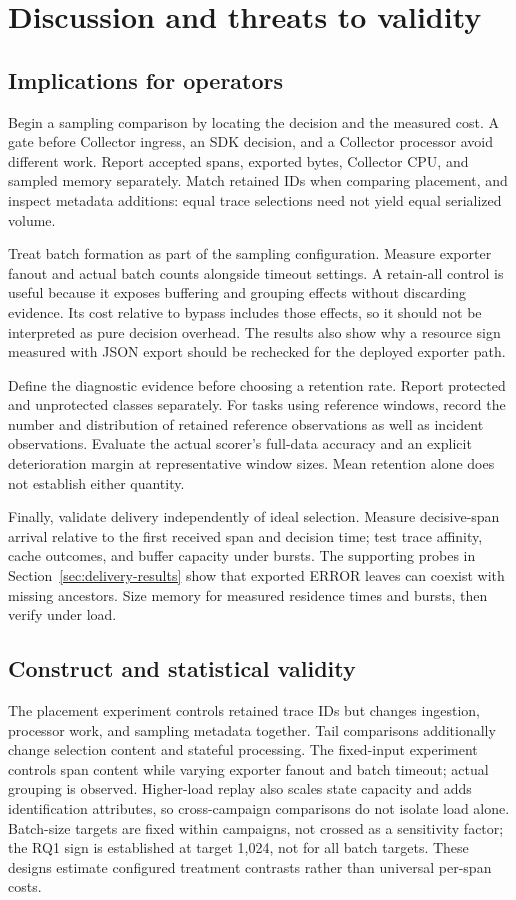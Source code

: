 \section{Discussion and threats to validity}\label{sec:discussion}
\subsection{Implications for operators}
Begin a sampling comparison by locating the decision and the measured cost. A gate before Collector ingress, an SDK decision, and a Collector processor avoid different work. Report accepted spans, exported bytes, Collector CPU, and sampled memory separately. Match retained IDs when comparing placement, and inspect metadata additions: equal trace selections need not yield equal serialized volume.

Treat batch formation as part of the sampling configuration. Measure exporter fanout and actual batch counts alongside timeout settings. A retain-all control is useful because it exposes buffering and grouping effects without discarding evidence. Its cost relative to bypass includes those effects, so it should not be interpreted as pure decision overhead. The results also show why a resource sign measured with JSON export should be rechecked for the deployed exporter path.

Define the diagnostic evidence before choosing a retention rate. Report protected and unprotected classes separately. For tasks using reference windows, record the number and distribution of retained reference observations as well as incident observations. Evaluate the actual scorer's full-data accuracy and an explicit deterioration margin at representative window sizes. Mean retention alone does not establish either quantity.

Finally, validate delivery independently of ideal selection. Measure decisive-span arrival relative to the first received span and decision time; test trace affinity, cache outcomes, and buffer capacity under bursts. The supporting probes in Section~\ref{sec:delivery-results} show that exported ERROR leaves can coexist with missing ancestors. Size memory for measured residence times and bursts, then verify under load.

\subsection{Construct and statistical validity}
The placement experiment controls retained trace IDs but changes ingestion, processor work, and sampling metadata together. Tail comparisons additionally change selection content and stateful processing. The fixed-input experiment controls span content while varying exporter fanout and batch timeout; actual grouping is observed. Higher-load replay also scales state capacity and adds identification attributes, so cross-campaign comparisons do not isolate load alone. Batch-size targets are fixed within campaigns, not crossed as a sensitivity factor; the RQ1 sign is established at target 1,024, not for all batch targets. These designs estimate configured treatment contrasts rather than universal per-span costs.

